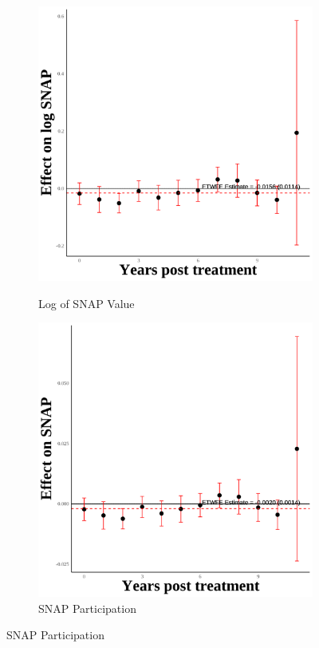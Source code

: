 \documentclass[12pt,english]{article}
\begin{document}
\begin{figure}[H]
  \begin{subfigure}[b]{0.3\textwidth}
    \centering
    \caption{Log of SNAP Value}
    \includegraphics[width=\linewidth]{figures/plot29-ln_snap_event_study-secgen-hh.png}
    \label{fig:ln-snap-secgen-hh}
  \end{subfigure}
  \hfill
  \begin{subfigure}[b]{0.3\textwidth}
    \centering
    \caption{SNAP Participation}
    \includegraphics[width=\linewidth]{figures/plot30-snap_event_study-secgen-hh.png}

\end{subfigure}
\end{figure}
\end{document}

